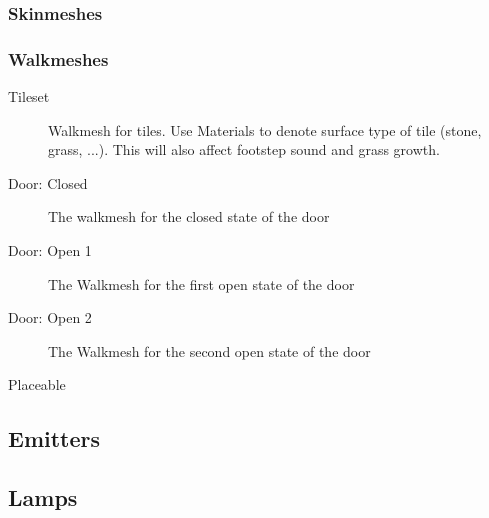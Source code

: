 \subsubsection{Skinmeshes}

\subsubsection{Walkmeshes}
\begin{description}
    \item[Tileset] Walkmesh for tiles. Use Materials to denote surface type of
                   tile (stone, grass, ...). This will also affect footstep
                   sound and grass growth.
    \item[Door: Closed] The walkmesh for the closed state of the door
    \item[Door: Open 1] The Walkmesh for the first open state of the door
    \item[Door: Open 2] The Walkmesh for the second open state of the door
    \item[Placeable]
\end{description}
\subsection{Emitters}

\subsection{Lamps}

